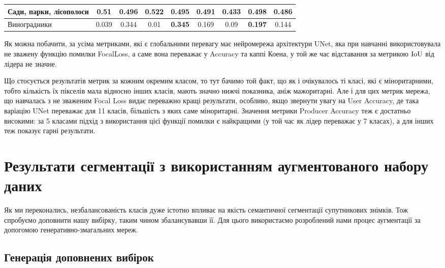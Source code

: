\begin{table}[!ht]
\begin{tabular}{|K|C|C|C|C|C|C|C|C|}
        \hline Сади, парки, лісополоси & 0.51                            & 0.496                           & \textbf{0.522} & 0.495          & 0.491          & 0.433          & \textbf{0.498} & 0.486          \\
        \hline Виноградники            & 0.039                           & 0.344                           & 0.01           & \textbf{0.345} & 0.169          & 0.09           & \textbf{0.197} & 0.144          \\
        \hline
    \end{tabular}
    \label{tab:segm_result_real_per_classes}
\end{table}

Як можна побачити, за усіма метриками, які є глобальними
перевагу має нейромережа архітектури UNet, яка
при навчанні використовувала не зважену функцію
помилки FocalLoss, а саме вона переважає у Accuracy та
каппі Коена, у той же час відставання за метрикою $\operatorname{IoU}$
від лідера не значне.

Що стосується результатів метрик за
кожним окремим класом, то тут бачимо той факт, що як і
очікувалось ті класі, які є міноритарними, тобто кількість їх
пікселів мала відносно інших класів, мають значно нижчі показника,
аніж мажоритарні. Але і для цих метрик мережа, що
навчалась з не зваженим Focal Loss видає переважно кращі
результати, особливо, якщо звернути увагу
на User Accuracy, де така варіацію UNet переважає
для 11 класів, більшість з яких саме міноритарні.
Значення метрики Producer Accuracy теж є достатньо
високими: за 5 класами підхід з використання цієї функції
помилки є найкращими (у той час як лідер переважає у
7 класах), а для інших теж показує гарні результати.

\section{Результати сегментації з використанням аугментованого набору даних}

Як ми переконались, незбалансованість класів дуже
істотно впливає на якість семантичної сегментації супутникових
знімків. Тож спробуємо доповнити нашу вибірку, таким чином збалансувавши її.
Для цього використаємо розроблений нами процес аугментації
за допогомою генеративно-змагальних мереж.

\subsection{Генерація доповнених вибірок}

